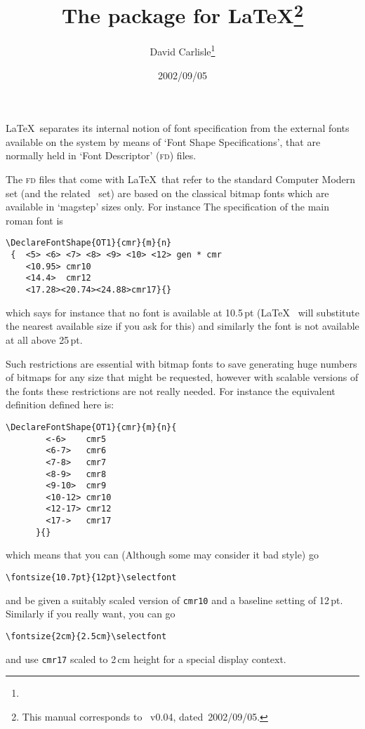 \documentclass[pagesize=auto]{scrartcl}
\title{The \pkg{type1cm} package for \LaTeX\thanks{This manual corresponds to \pkg{type1cm.sty}~v0.04, dated~2002/09/05.}}
\author{David Carlisle\thanks{\mail{david@dcarlisle.demon.co.uk}}}
\date{2002/09/05}
\begin{document}
\maketitle

\noindent
\LaTeX\ separates its internal notion of font specification
from the external fonts available on the system by means of
`Font Shape Specifications', that are normally held in 
`Font Descriptor' (\textsc{fd}) files.

The \textsc{fd} files that come with \LaTeX\ that refer to the standard
Computer Modern set (and the related \AmS\ set) are based on
the classical bitmap fonts which are available in `magstep'
sizes only. For instance The specification of the main roman font is
%
\begin{lstlisting}
\DeclareFontShape{OT1}{cmr}{m}{n}
 {  <5> <6> <7> <8> <9> <10> <12> gen * cmr
    <10.95> cmr10
    <14.4>  cmr12
    <17.28><20.74><24.88>cmr17}{}
\end{lstlisting}
%
which says for instance that no font is available at 10.5\,pt (\LaTeX\ %
will substitute the nearest available size if you ask for this)
and similarly the font is not available at all above 25\,pt.

Such restrictions are essential with bitmap fonts to save generating
huge numbers of bitmaps for any size that might be requested, however
with scalable versions of the fonts these restrictions are not really 
needed. For instance the equivalent definition defined here is:
%
\begin{lstlisting}
\DeclareFontShape{OT1}{cmr}{m}{n}{
        <-6>    cmr5
        <6-7>   cmr6
        <7-8>   cmr7
        <8-9>   cmr8
        <9-10>  cmr9
        <10-12> cmr10
        <12-17> cmr12
        <17->   cmr17
      }{}
\end{lstlisting}
%
which means that you can (Although some may consider it bad style)
go
%
\begin{verbatim}
\fontsize{10.7pt}{12pt}\selectfont
\end{verbatim}
%
and be given a suitably scaled
version of \texttt{cmr10} and a baseline setting of 12\,pt. Similarly if you really
want, you can go
%
\begin{verbatim}
\fontsize{2cm}{2.5cm}\selectfont
\end{verbatim}
%
and use \texttt{cmr17} scaled
to 2\,cm height for a special display context.
\end{document}
